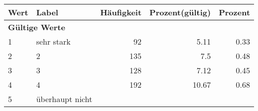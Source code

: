      \begin{longtable}{lXrrr}
     \toprule
     \textbf{Wert} & \textbf{Label} & \textbf{Häufigkeit} & \textbf{Prozent(gültig)} & \textbf{Prozent} \\
     \endhead
     \midrule
     \multicolumn{5}{l}{\textbf{Gültige Werte}}\\

     1 &
     \multicolumn{1}{X}{ sehr stark   } &


       \num{92} &
       \num[round-mode=places,round-precision=2]{5.11} &
         \num[round-mode=places,round-precision=2]{0.33} \\

     2 &
     \multicolumn{1}{X}{ 2   } &


       \num{135} &
       \num[round-mode=places,round-precision=2]{7.5} &
         \num[round-mode=places,round-precision=2]{0.48} \\

     3 &
     \multicolumn{1}{X}{ 3   } &


       \num{128} &
       \num[round-mode=places,round-precision=2]{7.12} &
         \num[round-mode=places,round-precision=2]{0.45} \\

     4 &
     \multicolumn{1}{X}{ 4   } &


       \num{192} &
       \num[round-mode=places,round-precision=2]{10.67} &
         \num[round-mode=places,round-precision=2]{0.68} \\

     5 &
     \multicolumn{1}{X}{ überhaupt nicht   } &



\end{longtable}
